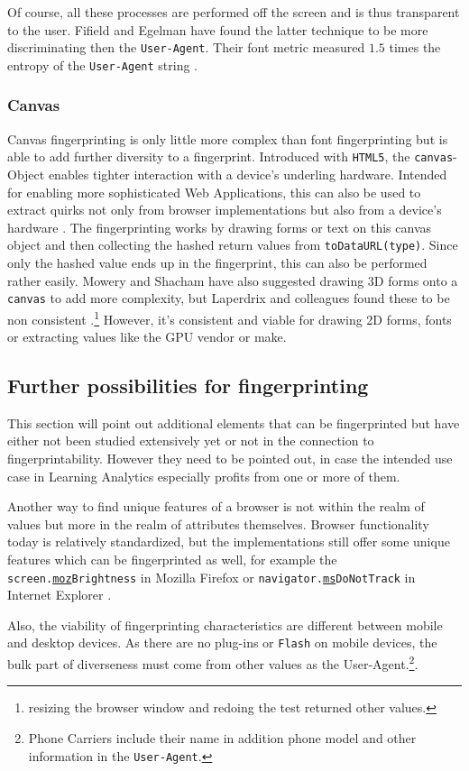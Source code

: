 Of course, all these processes are performed off the screen and is thus transparent to the user. Fifield and Egelman have found the latter technique to be more discriminating then the \texttt{User-Agent}. Their font metric measured $1.5$ times the entropy of the \texttt{User-Agent} string \cite{fifield_fingerprinting_2015} .

\subsubsection{Canvas}
\label{sota:canvas}
\cite{mowery_pixel_2012} Canvas fingerprinting is only little more complex than font fingerprinting but is able to add further diversity to a fingerprint. Introduced with \texttt{HTML5}, the \texttt{canvas}-Object enables tighter interaction with a device's underling hardware. Intended for enabling more sophisticated Web Applications, this can also be used to extract quirks not only from browser implementations but also from a device's hardware \cite{mowery_pixel_2012}. The fingerprinting works by drawing forms or text on this canvas object and then collecting the hashed return values from \texttt{toDataURL(type)}. Since only the hashed value ends up in the fingerprint, this can also be performed rather easily. 
Mowery and Shacham have also suggested drawing 3D forms onto a \texttt{canvas} to add more complexity, but Laperdrix and colleagues found these to be non consistent \cite{laperdrix_beauty_2016}.\footnote{resizing the browser window and redoing the test returned other values.} However, it's consistent and viable for drawing 2D forms, fonts or extracting values like the GPU vendor or make.

\subsection{Further possibilities for fingerprinting}
\label{subsec:furtherposs}

This section will point out additional elements that can be fingerprinted but have either not been studied extensively yet or not in the connection to fingerprintability. However they need to be pointed out, in case the intended use case in Learning Analytics especially profits from one or more of them.

Another way to find unique features of a browser is not within the realm of values but more in the realm of attributes themselves. Browser functionality today is relatively standardized, but the implementations still offer some unique features which can be fingerprinted as well, for example the \texttt{screen.\underline{moz}Brightness} in Mozilla Firefox or \texttt{navigator.\underline{ms}DoNotTrack} in Internet Explorer \cite{nikiforakis_cookieless_2013}.

Also, the viability of fingerprinting characteristics are different between mobile and desktop devices. As there are no plug-ins or \texttt{Flash} on mobile devices, the bulk part of diverseness must come from other values as the User-Agent.\footnote{Phone Carriers include their name in addition phone model and other information in the \texttt{User-Agent}.}\cite{laperdrix_beauty_2016}.
